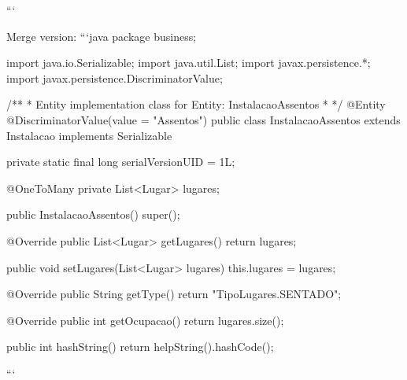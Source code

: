 \begin{prompt}
{   }
  ```
  
  Merge version:
  ```java
  package business;
  
  import java.io.Serializable;
  import java.util.List;
  import javax.persistence.*;
  import javax.persistence.DiscriminatorValue;
  
  /**
   * Entity implementation class for Entity: InstalacaoAssentos
   *
   */
  @Entity
  @DiscriminatorValue(value = "Assentos")
  public class InstalacaoAssentos extends Instalacao implements Serializable {
    
    private static final long serialVersionUID = 1L;
    
    @OneToMany
    private List<Lugar> lugares;
  
    public InstalacaoAssentos() {
      super();
    }
    
    @Override
    public List<Lugar> getLugares() {
      return lugares;
    }
  
    public void setLugares(List<Lugar> lugares) {
      this.lugares = lugares;
    }
  
    @Override
    public String getType() {
      return "TipoLugares.SENTADO";
    }
    
    @Override
    public int getOcupacao() {
      return lugares.size();
    }
  
    public int hashString(){
      return helpString().hashCode();
    }
     
  }
  ```
\end{prompt}

